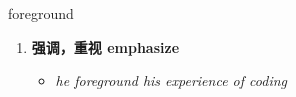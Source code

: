 
\begin{frame}
{\huge foreground}
\begin{center}
\begin{enumerate}\Large
  \item \textbf{强调，重视 emphasize}
  \begin{itemize}
    \item \em{\Large{he foreground his experience of coding}}
  \end{itemize}
\end{enumerate}
\end{center}
\end{frame}

